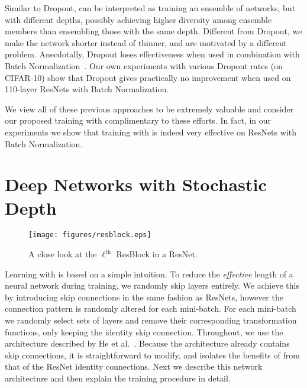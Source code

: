 \documentclass[runningheads]{llncs}
\begin{document}
Similar to Dropout, \name{} can be interpreted as training an ensemble of networks, but with different depths, possibly achieving higher diversity among ensemble members than ensembling those with the same depth. Different from Dropout, we make the network shorter instead of thinner, and are motivated by a different problem. Anecdotally, Dropout loses effectiveness when used in combination with Batch Normalization~\cite{ioffe2015batch,blogpostcifar10}. Our own experiments with various Dropout rates (on CIFAR-10) show that Dropout gives practically no improvement when used on 110-layer ResNets with Batch Normalization.

We view all of these previous approaches to be extremely valuable and consider our proposed training with \name{} complimentary to these efforts. In fact, in our experiments we show that training with \name{} is indeed very effective on ResNets with Batch Normalization.
 


\section{Deep Networks with Stochastic Depth}

\label{sec_method}



\begin{figure*}[t]
	\begin{center}
		\vspace{-2ex}
		\centerline{\texttt{[image: figures/resblock.eps]}}
		\vspace{-2ex}
		\caption{A close look at the $\ell^\text{th}$ ResBlock in a ResNet.\label{fig:resblock}}
		\vspace{-6ex}
	\end{center}
\end{figure*}

Learning with \name{} is based on a simple intuition. To reduce the \emph{effective} length of a neural network during training, we randomly skip layers entirely. We achieve this by introducing skip connections in the same fashion as ResNets, however the connection pattern is randomly altered for each mini-batch. For each mini-batch we randomly select sets of layers and remove their corresponding transformation functions, only keeping the identity skip connection.
Throughout, we use the architecture described by He et al.~\cite{he2015deep}. Because the architecture already contains skip connections, it is straightforward to modify, and isolates the benefits of \name{} from that of the ResNet identity connections. Next we describe this network architecture and then explain the \name{} training procedure in detail.
\end{document}
